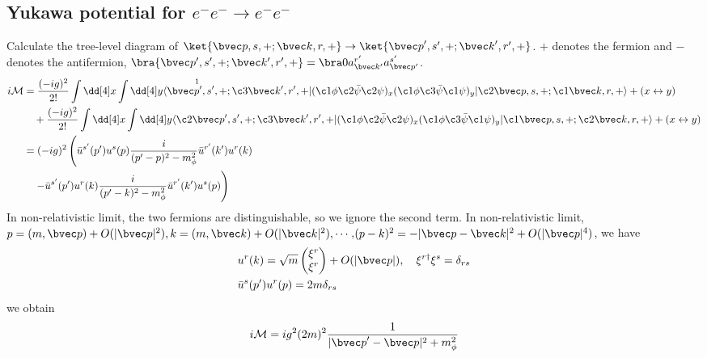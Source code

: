 
\subsection{\small Yukawa potential for $e^-e^-\rightarrow e^-e^-$}

Calculate the tree-level diagram of $\ket{{\bvec p},s,+;{\bvec k},r,+}\rightarrow \ket{{\bvec p}',s',+;{\bvec k}',r',+}$. $+$ denotes the fermion and $-$ denotes the antifermion, $\bra{\bvec p',s',+;\bvec k',r',+}=\bra 0 a_{\bvec k'}^{r'} a_{\bvec p'}^{s'}$.
\begin{equation}
\begin{aligned}
\notag i\mathcal{M}&=
\frac{(-ig)^2}{2!}\int \dd[4]x \int  \dd[4]y 
{
\langle\overset{1}{\bvec p',s',+};\c3{\bvec k',r',+}|
(\c1\phi  \c2{\bar{\psi}} \c2\psi)_x 
(\c1\phi \c3{\bar{\psi}} \c1\psi)_y
|\c2{\bvec p,s,+};\c1{\bvec k,r,+} \rangle
}+(x\leftrightarrow y)\\
&\quad +
\frac{(-ig)^2}{2!}\int \dd[4]x \int  \dd[4]y 
\langle\c2{\bvec p',s',+};\c3{\bvec k',r',+}|
(\c1\phi  \c2{\bar{\psi}} \c2\psi)_x 
(\c1\phi \c3{\bar{\psi}} \c1\psi)_y
|\c1{\bvec p,s,+};\c2{\bvec k,r,+} \rangle
+(x\leftrightarrow y)\\
&=(-ig)^2\left(
 \bar u^{s'}(p')u^s(p) \frac{i}{(p'-p)^2-m_{\phi}^2} \bar u^{r'}(k') u^r(k)
\right.\\
&\left.\quad 
-\bar u^{s'}(p')u^r(k) \frac{i}{(p'-k)^2-m_{\phi}^2} \bar u^{r'}(k') u^{s}(p)  \right)
\end{aligned}
\end{equation}
In non-relativistic limit, the two fermions are distinguishable, so we ignore the second term. In non-relativistic limit, $p=(m,{\bvec p})+O(|{\bvec p}|^2),k=(m,{\bvec k})+O(|{\bvec k}|^2),\cdots$,$(p-k)^2=-|{\bvec p}-{\bvec k}|^2+O(|{\bvec p}|^4)$, we have \begin{align*}
&u^r(k)=\sqrt{m} \begin{pmatrix}\xi^r\\ \xi^r\end{pmatrix}+O(|{\bvec p}|),\quad  \xi^{r\dagger}\xi^s=\delta_{rs}\\
&\bar u^s(p') u^r(p)=2m \delta_{rs}
\end{align*}
we obtain
\begin{equation}
\begin{aligned}
i\mathcal{M} = i g^2 (2m)^2 \frac{1}{|{\bvec p}'-{\bvec p}|^2+m_\phi^2}
\end{aligned}
\end{equation}
